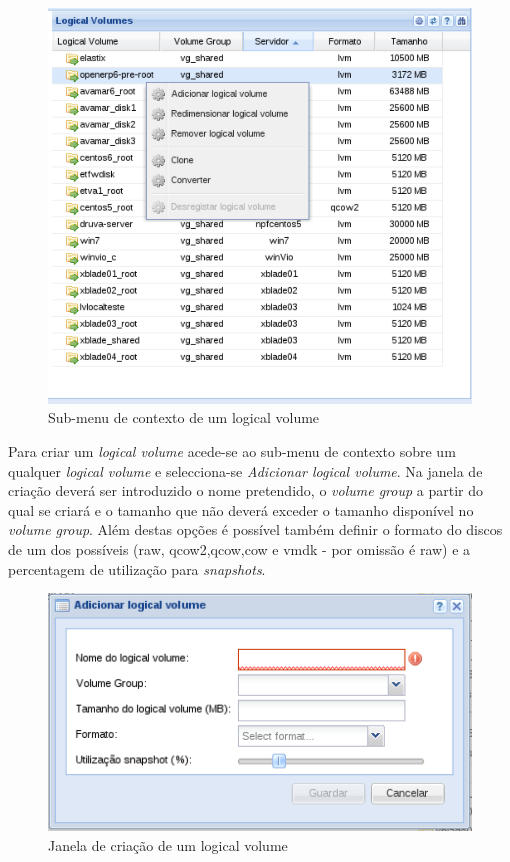 \begin{figure}[H]
        \begin{center}
        \includegraphics[scale=0.45]{screenshots/node_storage_lv_ctx.png}
        \caption{Sub-menu de contexto de um logical volume}
        \label{fig:storage_lv_ctx}
        \end{center}
\end{figure}

Para criar um \emph{logical volume} acede-se ao sub-menu de contexto sobre um qualquer \emph{logical volume} e selecciona-se \emph{Adicionar logical volume}.
Na janela de criação deverá ser introduzido o nome pretendido, o \emph{volume group} a partir do qual se criará e o tamanho que não deverá exceder o tamanho disponível no \emph{volume group}.
Além destas opções é possível também definir o formato do discos de um dos possíveis (raw, qcow2,qcow,cow e vmdk - por omissão é raw) e a percentagem de utilização para \emph{snapshots}.

\begin{figure}[H]
        \begin{center}
        \includegraphics[scale=0.5]{screenshots/storage_lv_create.png}
        \caption{Janela de criação de um logical volume}
        \label{fig:storage_lv_create}
        \end{center}
\end{figure}

